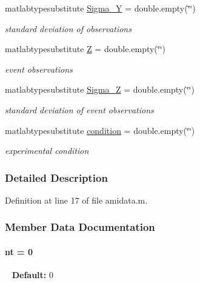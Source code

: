 \begin{DoxyCompactItemize}
matlabtypesubstitute \hyperlink{classamidata_a4bd82fb17b03a0039c2f0347ec8dc393}{Sigma\+\_\+\+Y} = double.\+empty(\char`\"{}\char`\"{})
\begin{DoxyCompactList}\small\item\em standard deviation of observations \end{DoxyCompactList}\item 
matlabtypesubstitute \hyperlink{classamidata_adc18d83abfd9f87d396e8fd6b6ac0fe1}{Z} = double.\+empty(\char`\"{}\char`\"{})
\begin{DoxyCompactList}\small\item\em event observations \end{DoxyCompactList}\item 
matlabtypesubstitute \hyperlink{classamidata_a77b1f0ddcfbfb895b17d62a414d35673}{Sigma\+\_\+\+Z} = double.\+empty(\char`\"{}\char`\"{})
\begin{DoxyCompactList}\small\item\em standard deviation of event observations \end{DoxyCompactList}\item 
matlabtypesubstitute \hyperlink{classamidata_a4824b91cc0e6b5f112bdd8049af4d7d6}{condition} = double.\+empty(\char`\"{}\char`\"{})
\begin{DoxyCompactList}\small\item\em experimental condition \end{DoxyCompactList}\end{DoxyCompactItemize}


\subsubsection{Detailed Description}


Definition at line 17 of file amidata.\+m.



\subsubsection{Member Data Documentation}
\hypertarget{classamidata_a03cfcdd983bff4aef77268b785b28345}{}
\paragraph[{nt}]{\setlength{\rightskip}{0pt plus 5cm}nt = 0}\label{classamidata_a03cfcdd983bff4aef77268b785b28345}
~\newline
{\bfseries Default\+:} 0

